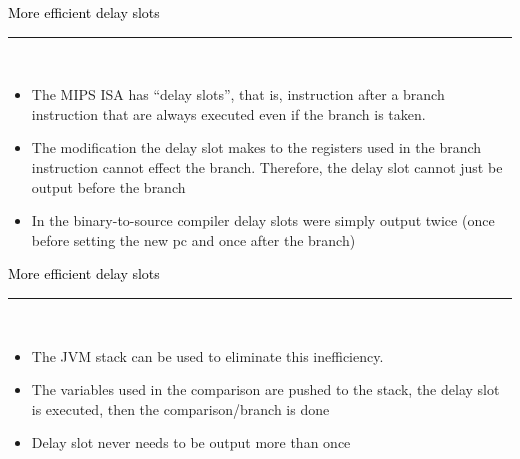 \documentclass[letter]{seminar}
\begin{document}
\begin{slide}\raggedright
\renewcommand{\leftmargini}{5mm}
{\Large{\textcolor{black}{More efficient delay slots}}}
\\\rule{\textwidth}{0.1pt}\\

\begin{itemize}


\item
     The MIPS ISA has ``delay slots'', that is, instruction after a branch instruction 
      that are always executed even if the branch is taken.

\item
     The modification the delay slot makes to the registers used in the branch 
      instruction cannot effect the branch. Therefore, the delay slot cannot just be 
      output before the branch

\item
     In the binary-to-source compiler delay slots were simply output twice (once 
      before setting the new pc and once after the branch)


\end{itemize}


\end{slide}


\begin{slide}\raggedright
\renewcommand{\leftmargini}{5mm}
{\Large{\textcolor{black}{More efficient delay slots}}}
\\\rule{\textwidth}{0.1pt}\\

\begin{itemize}


\item
     The JVM stack can be used to eliminate this inefficiency.

\item
     The variables used in the comparison are pushed to the stack, the 
      delay slot is executed, then the comparison/branch is done

\item
     Delay slot never needs to be output more than once


\end{itemize}


\end{slide}
\end{document}
